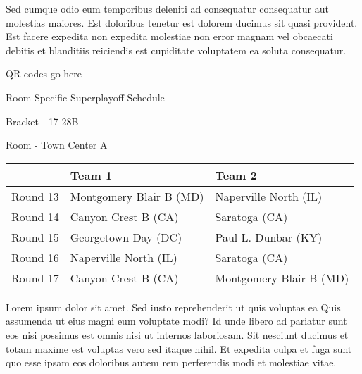 \documentclass{article}%
\begin{document}
\newline%
Sed cumque odio eum temporibus deleniti ad consequatur consequatur aut molestias maiores. Est doloribus tenetur est dolorem ducimus sit quasi provident. Est facere expedita non expedita molestiae non error magnam vel obcaecati debitis et blanditiis reiciendis est cupiditate voluptatem ea soluta consequatur.%
\vspace*{140pt}%
\begin{center}%
\begin{Huge}%
QR codes go here%
\end{Huge}%
\end{center}%
\newpage%
\begin{center}%
\begin{Huge}%
Room Specific Superplayoff Schedule%
\end{Huge}%
\vspace*{8pt}%
\linebreak%
\begin{Large}%
Bracket {-} 17{-}28B%
\end{Large}%
\vspace*{8pt}%
\linebreak%
\vspace*{8pt}%
\begin{Large}%
Room {-} Town Center A%
\end{Large}%
\end{center}%
%
\begin{tabularx}{\textwidth}{|c|Y|Y|}%
\hline%
&Team 1&Team 2\\%
\hline%
Round 13&Montgomery Blair B (MD)&Naperville North (IL)\\%
Round 14&Canyon Crest B (CA)&Saratoga (CA)\\%
Round 15&Georgetown Day (DC)&Paul L. Dunbar (KY)\\%
Round 16&Naperville North (IL)&Saratoga (CA)\\%
Round 17&Canyon Crest B (CA)&Montgomery Blair B (MD)\\%
\hline%
\end{tabularx}%
\vspace*{8pt}%
\newline%
Lorem ipsum dolor sit amet. Sed iusto reprehenderit ut quis voluptas ea Quis assumenda ut eius magni eum voluptate modi? Id unde libero ad pariatur sunt eos nisi possimus est omnis nisi ut internos laboriosam. Sit nesciunt ducimus et totam maxime est voluptas vero sed itaque nihil. Et expedita culpa et fuga sunt quo esse ipsam eos doloribus autem rem perferendis modi et molestiae vitae.\newline%
\end{document}
